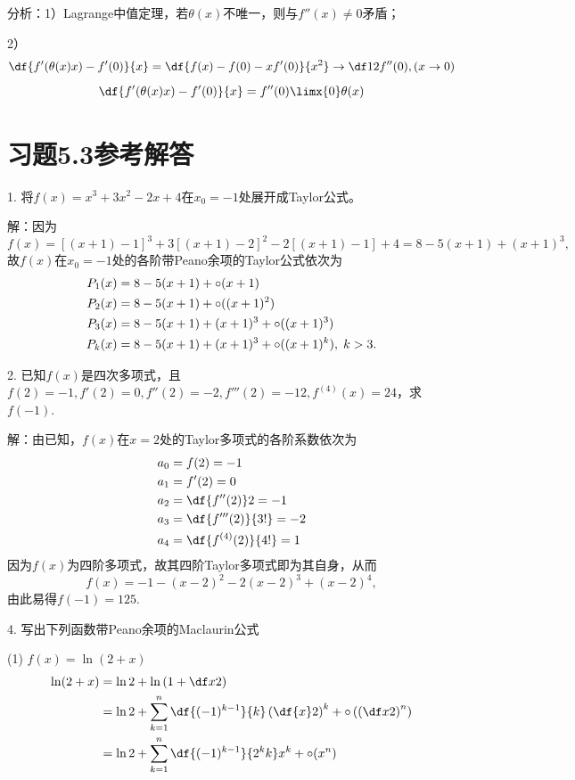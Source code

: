 分析：1）Lagrange中值定理，若$\theta(x)$不唯一，则与$f''(x)\ne 0$矛盾；

2）
$$\df{f'(\theta(x)x)-f'(0)}{x}=\df{f(x)-f(0)-xf'(0)}{x^2}\to\df12f''(0),(x\to0)$$
$$\df{f'(\theta(x)x)-f'(0)}{x}=f''(0)\limx{0}\theta(x)$$

\newpage

\section*{习题5.3参考解答}

1. 将$f(x)=x^3+3x^2-2x+4$在$x_0=-1$处展开成Taylor公式。

解：因为
$$f(x)=[(x+1)-1]^3+3[(x+1)-2]^2-2[(x+1)-1]+4
=8-5(x+1)+(x+1)^3,$$
故$f(x)$在$x_0=-1$处的各阶带Peano余项的Taylor公式依次为
\begin{align}
	P_1(x)&=8-5(x+1)+\circ(x+1)\notag\\
	P_2(x)&=8-5(x+1)+\circ((x+1)^2)\notag\\
	P_3(x)&=8-5(x+1)+(x+1)^3+\circ((x+1)^3)\notag\\
	P_k(x)&=8-5(x+1)+(x+1)^3+\circ((x+1)^k),\;k>3.\notag
\end{align}

\bigskip

2. 已知$f(x)$是四次多项式，且$f(2)=-1,f'(2)=0,f''(2)=-2,f'''(2)=-12,
f^{(4)}(x)=24$，求$f(-1)$.

解：由已知，$f(x)$在$x=2$处的Taylor多项式的各阶系数依次为
\begin{align}
	a_0&=f(2)=-1\notag\\
	a_1&={f'(2)}=0\notag\\
	a_2&=\df{f''(2)}2=-1\notag\\
	a_3&=\df{f'''(2)}{3!}=-2\notag\\
	a_4&=\df{f^{(4)}(2)}{4!}=1\notag
\end{align}
因为$f(x)$为四阶多项式，故其四阶Taylor多项式即为其自身，从而
$$f(x)=-1-(x-2)^2-2(x-2)^3+(x-2)^4,$$
由此易得$f(-1)=125$.

\bigskip

4. 写出下列函数带Peano余项的Maclaurin公式

(1) $f(x)=\ln(2+x)$
\begin{align}
	\ln(2+x)&=\ln2+\ln\left(1+\df x2\right)\notag\\
	&=\ln2+\sum\limits_{k=1}^n\df{(-1)^{k-1}}{k}\left(
	\df{x}2\right)^k+\circ\left(\left(\df x2\right)^n\right)\notag\\
	&=\ln2+\sum\limits_{k=1}^n\df{(-1)^{k-1}}{2^kk}x^k+\circ(x^n)\notag
\end{align}

